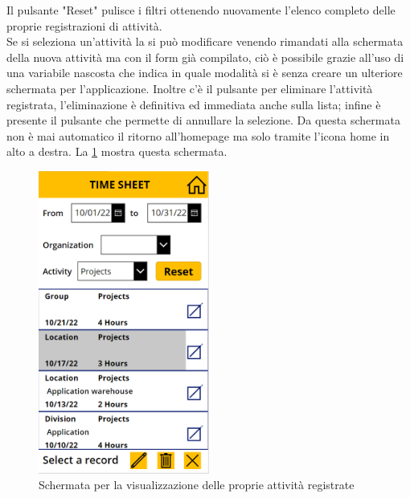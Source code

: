 Il pulsante "Reset" pulisce i filtri ottenendo nuovamente l'elenco completo delle proprie registrazioni di attività.\\ 
Se si seleziona un'attività la si può modificare venendo rimandati alla schermata della nuova attività ma con il form già compilato, ciò è possibile grazie all'uso di una variabile nascosta che indica in quale modalità si è senza creare un ulteriore schermata per l'applicazione.
Inoltre c'è il pulsante per eliminare l'attività registrata, l'eliminazione è definitiva ed immediata anche sulla lista; infine è presente il pulsante che permette di annullare la selezione.
Da questa schermata non è mai automatico il ritorno all'homepage ma solo tramite l'icona home in alto a destra.
La \figurename \space \ref*{fig:IT-View} mostra questa schermata.\\
\begin{figure}[H]
  \centering\includegraphics[width=0.5\textwidth, height=0.5\textheight,keepaspectratio]{immagini/IT-view.png}
  \caption{Schermata per la visualizzazione delle proprie attività registrate}
  \label{fig:IT-View}
\end{figure}
\newpage %
